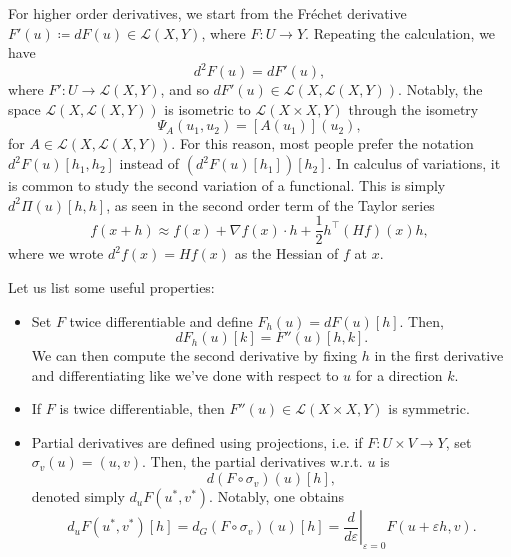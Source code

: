 For higher order derivatives, we start from the Fréchet derivative $F'(u) \coloneqq dF(u)\in \mathcal{L}(X,Y)$, where $F:U\to Y$. Repeating the calculation, we have
\begin{equation*}
    d^2 F(u) = dF'(u), 
\end{equation*} 
where $F': U\to \mathcal{L}(X,Y)$, and so $dF'(u) \in \mathcal{L}(X, \mathcal{L}(X,Y))$. Notably, the space $\mathcal{L}(X, \mathcal{L}(X,Y))$ is isometric to $\mathcal{L}(X\times X,Y)$ through the isometry
\begin{equation*}
    \Psi_A(u_1,u_2) = [A(u_1)](u_2),
\end{equation*} 
for $A\in \mathcal{L}(X,\mathcal{L}(X,Y))$. For this reason, most people prefer the notation $d^2 F(u) [h_1,h_2]$ instead of $(d^2 F(u)[h_1])[h_2]$. In calculus of variations, it is common to study the second variation of a functional. This is simply $d^2 \Pi(u)[h,h]$, as seen in the second order term of the Taylor series
\begin{equation*}
    f(x+h)\approx f(x) + \nabla f(x) \cdot h + \frac{1}{2} h^\top (Hf)(x) h,
\end{equation*} 
where we wrote $d^2 f(x) = Hf(x)$ as the Hessian of $f$ at $x$.

Let us list some useful properties:
\begin{itemize}
    \item Set $F$ twice differentiable and define $F_h(u)=dF(u)[h]$. Then,
    \begin{equation}\label{eq:second-derivative-property}
        dF_h(u)[k] = F''(u)[h,k]. 
    \end{equation}
    We can then compute the second derivative by fixing $h$ in the first derivative and differentiating like we've done with respect to $u$ for a direction $k$.
    \item If $F$ is twice differentiable, then $F''(u)\in \mathcal{L}(X\times X, Y)$ is symmetric.
    \item Partial derivatives are defined using projections, i.e. if $F: U\times V \to Y$, set $\sigma_v(u)=(u,v)$. Then, the partial derivatives w.r.t. $u$ is
    \begin{equation*}
        d(F\circ \sigma_v)(u)[h],
    \end{equation*}
    denoted simply $d_u F(u^*,v^*)$. Notably, one obtains
    \begin{equation*}
        d_u F(u^*,v^*)[h] = d_G(F\circ \sigma_v)(u)[h] = \left.\frac{d}{d\varepsilon}\right|_{\varepsilon = 0} F(u+\varepsilon h, v).
    \end{equation*}
\end{itemize}

